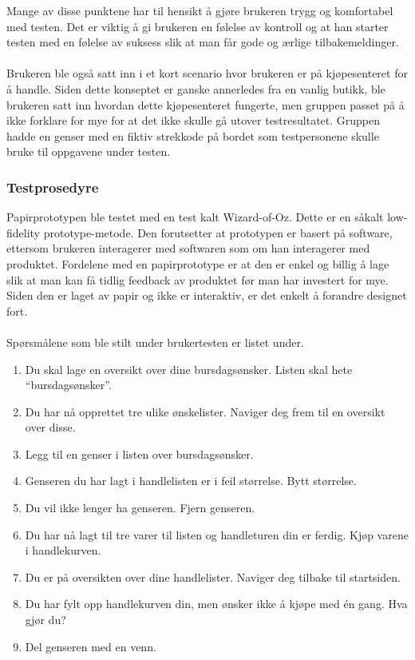 \noindent Mange av disse punktene har til hensikt å gjøre brukeren trygg og komfortabel med testen. Det er viktig å gi brukeren en følelse av kontroll og at han starter testen med en følelse av suksess slik at man får gode og ærlige tilbakemeldinger.
\\\\
Brukeren ble også satt inn i et kort scenario hvor brukeren er på kjøpesenteret for å handle. Siden dette konseptet er ganske annerledes fra en vanlig butikk, ble brukeren satt inn hvordan dette kjøpesenteret fungerte, men gruppen passet på å ikke forklare for mye for at det ikke skulle gå utover testresultatet. Gruppen hadde en genser med en fiktiv strekkode på bordet som testpersonene skulle bruke til oppgavene under testen.

\subsubsection{Testprosedyre}
Papirprototypen ble testet med en test kalt Wizard-of-Oz. Dette er en såkalt low-fidelity prototype-metode\cite[p.~391]{preece}. Den forutsetter at prototypen er basert på software, ettersom brukeren interagerer med softwaren som om han interagerer med produktet. Fordelene med en papirprototype er at den er enkel og billig å lage slik at man kan få tidlig feedback av produktet før man har investert for mye. Siden den er laget av papir og ikke er interaktiv, er det enkelt å forandre designet fort. 
\\\\
Spørsmålene som ble stilt under brukertesten er listet under.

\begin{enumerate}
    \item Du skal lage en oversikt over dine bursdagsønsker. Listen skal hete “bursdagsønsker”.
    \item Du har nå opprettet tre ulike ønskelister. Naviger deg frem til en oversikt over disse.
    \item Legg til en genser i listen over bursdagsønsker. 
    \item Genseren du har lagt i handlelisten er i feil størrelse. Bytt størrelse.
    \item Du vil ikke lenger ha genseren. Fjern genseren.
    \item Du har nå lagt til tre varer til listen og handleturen din er ferdig. Kjøp varene i handlekurven.
    \item Du er på oversikten over dine handlelister. Naviger deg tilbake til startsiden.
    \item Du har fylt opp handlekurven din, men ønsker ikke å kjøpe med én gang. Hva gjør du?
    \item Del genseren med en venn.
\end{enumerate}

